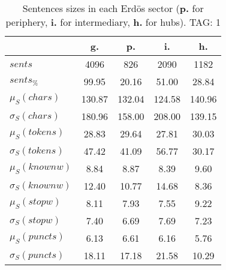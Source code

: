 \begin{table}[h!]
\begin{center}
\begin{tabular}{| l || c | c | c | c |}\hline
 & {\bf g.} & {\bf p.} & {\bf i.} & {\bf h.} \\\hline\hline
$sents$ & 4096  & 826  & 2090  & 1182 \\
$sents_{\%}$ & 99.95  & 20.16  & 51.00  & 28.84 \\\hline
$\mu_S(chars)$ & 130.87  & 132.04  & 124.58  & 140.96 \\
$\sigma_S(chars)$ & 180.96  & 158.00  & 208.00  & 139.15 \\\hline
$\mu_S(tokens)$ & 28.83  & 29.64  & 27.81  & 30.03 \\
$\sigma_S(tokens)$ & 47.42  & 41.09  & 56.77  & 30.17 \\\hline
$\mu_S(knownw)$ & 8.84  & 8.87  & 8.39  & 9.60 \\
$\sigma_S(knownw)$ & 12.40  & 10.77  & 14.68  & 8.36 \\\hline
$\mu_S(stopw)$ & 8.11  & 7.93  & 7.55  & 9.22 \\
$\sigma_S(stopw)$ & 7.40  & 6.69  & 7.69  & 7.23 \\\hline
$\mu_S(puncts)$ & 6.13  & 6.61  & 6.16  & 5.76 \\
$\sigma_S(puncts)$ & 18.11  & 17.18  & 21.58  & 10.29 \\\hline
\end{tabular}
\caption{Sentences sizes in each Erd\"os sector ({{\bf p.}} for periphery, {{\bf i.}} for intermediary, {{\bf h.}} for hubs). TAG: 1}
\end{center}
\end{table}